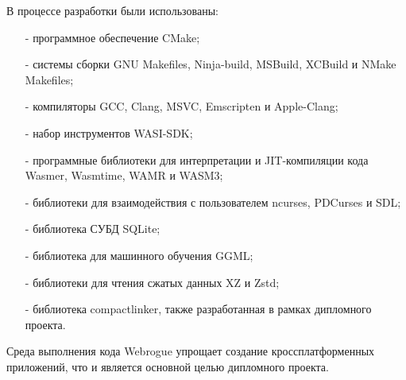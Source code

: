 В процессе разработки были использованы:
\begin{itemize}
    \item[-] программное обеспечение CMake;
    \item[-] системы сборки GNU Makefiles, Ninja-build, MSBuild, XCBuild и NMake Makefiles;
    \item[-] компиляторы GCC, Clang, MSVC, Emscripten и Apple-Clang;
    \item[-] набор инструментов WASI-SDK;
    \item[-] программные библиотеки для интерпретации и JIT-компиляции кода Wasmer, Wasmtime, WAMR и WASM3;
    \item[-] библиотеки для взаимодействия с пользователем ncurses, PDCurses и SDL;\item[-] библиотека СУБД SQLite;
    \item[-] библиотека для машинного обучения GGML;
    \item[-] библиотеки для чтения сжатых данных XZ и Zstd;
    \item[-] библиотека compactlinker, также разработанная в рамках дипломного проекта.
\end{itemize}

Среда выполнения кода Webrogue упрощает создание кроссплатформенных приложений, что и является основной целью дипломного проекта.
